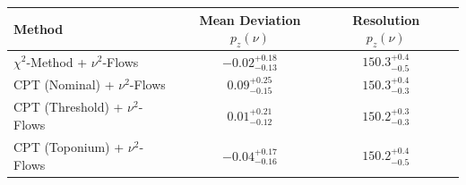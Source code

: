     \begin{tabular}{lccc}
        \toprule
        Method & Mean Deviation $p_{z}(\nu)$ & Resolution $p_{z}(\nu)$ \\
        \midrule
        $\chi^2$-Method + $\nu^2$-Flows & $-0.02^{+0.18}_{-0.13}$ & $150.3^{+0.4}_{-0.5}$ \\
        CPT (Nominal) + $\nu^2$-Flows & $0.09^{+0.25}_{-0.15}$ & $150.3^{+0.4}_{-0.3}$ \\
        CPT (Threshold) + $\nu^2$-Flows & $0.01^{+0.21}_{-0.12}$ & $150.2^{+0.3}_{-0.3}$ \\
        CPT (Toponium) + $\nu^2$-Flows & $-0.04^{+0.17}_{-0.16}$ & $150.2^{+0.4}_{-0.5}$ \\
        \bottomrule
    \end{tabular}